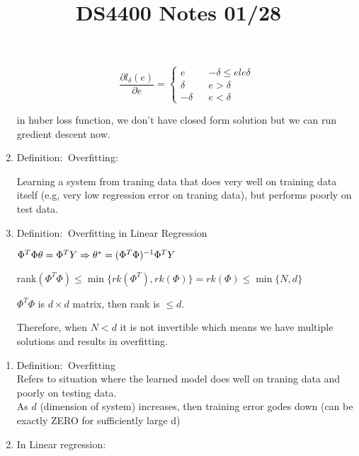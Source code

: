 \documentclass[12pt]{article}
\newcommand{\defi}{{\color{blue} Definition: $\ $}}
\begin{document}
\begin{multicols}{2}
\begin{enumerate}
             $$
             \frac{\partial l_{\delta}(e)}{\partial e} = 
             \left\{
                 \begin{array}{rcl}
                    e & & -\delta \le e le \delta\\
                    \delta & & e > \delta\\
                    -\delta & & e < \delta
                 \end{array}
             \right.
             $$

             in huber loss function, we don't have closed form solution but we can run gredient descent now.

             \item \defi Overfitting: 
             
             Learning a system from traning data that does very well on training data itself (e.g, very low regression error on traning data), but performs poorly on test data.

             \item \defi Overfitting in Linear Regression
             
             $\Phi^T \Phi \theta = \Phi^T Y \\ 
             \Rightarrow \theta^* = (\Phi^T \Phi)^{-1} \Phi^T Y$

             rank$(\Phi^T \Phi) \le \min \{rk(\Phi^T), rk(\Phi)\} = rk(\Phi) \le \min\{N,d\}$

             $\Phi^T\Phi$ is $d\times d$ matrix, then rank is $\le d$.

             Therefore, when $N < d$ it is not invertible which means we have multiple solutions and results in overfitting.
        \end{enumerate}
        \title{DS4400 Notes 01/28}
        \maketitle
        \begin{enumerate}
            \item \defi Overfitting\\
            Refers to situation where the learned model does well on traning data and poorly on testing data.\\
            As $d$ (dimension of system) increases, then training error godes down (can be exactly ZERO for sufficiently large d)

            \item In Linear regression:
            

\end{enumerate}
\end{multicols}
\end{document}
